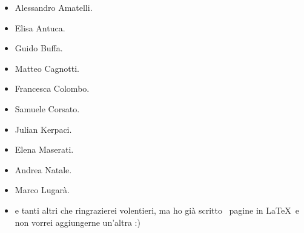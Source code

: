 \begin{multicols}{2}
	\begin{itemize}
		\item Alessandro Amatelli.
		\item Elisa Antuca.
		\item Guido Buffa.
		\item Matteo Cagnotti.
		\item Francesca Colombo.
		\item Samuele Corsato.
		\item Julian Kerpaci.
		\item Elena Maserati.
		\item Andrea Natale.
		\item Marco Lugarà.
		\item e tanti altri che ringrazierei volentieri, ma ho già scritto \thelastpage \ pagine in \LaTeX \ e non vorrei aggiungerne un'altra :)
	\end{itemize}
\end{multicols}
